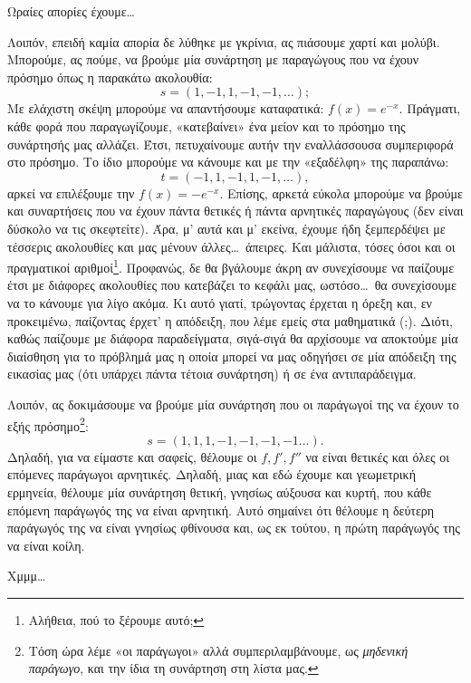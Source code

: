 \documentclass[11pt,a4paper]{article}
\theoremstyle{definition}
\begin{document}
	Ωραίες απορίες έχουμε\ldots
	
	Λοιπόν, επειδή καμία απορία δε λύθηκε με γκρίνια, ας πιάσουμε χαρτί και μολύβι. Μπορούμε, ας πούμε, να βρούμε μία συνάρτηση με παραγώγους που να έχουν πρόσημο όπως η παρακάτω ακολουθία:
	\[s=(1,-1,1,-1,-1,\ldots);\]
	Με ελάχιστη σκέψη μπορούμε να απαντήσουμε καταφατικά: $f(x)=e^{-x}$. Πράγματι, κάθε φορά που παραγωγίζουμε, «κατεβαίνει» ένα μείον και το πρόσημο της συνάρτησής μας αλλάζει. Έτσι, πετυχαίνουμε αυτήν την εναλλάσσουσα συμπεριφορά στο πρόσημο. Το ίδιο μπορούμε να κάνουμε και με την «εξαδέλφη» της παραπάνω:
	\[t=(-1,1,-1,1,-1,\ldots),\]
	αρκεί να επιλέξουμε την $f(x)=-e^{-x}$. Επίσης, αρκετά εύκολα μπορούμε να βρούμε και συναρτήσεις που να έχουν πάντα θετικές ή πάντα αρνητικές παραγώγους (δεν είναι δύσκολο να τις σκεφτείτε). Άρα, μ' αυτά και μ' εκείνα, έχουμε ήδη ξεμπερδέψει με τέσσερις ακολουθίες και μας μένουν άλλες\ldots\  άπειρες. Και μάλιστα, τόσες όσοι και οι πραγματικοί αριθμοί\footnote{Αλήθεια, πού το ξέρουμε αυτό;}. Προφανώς, δε θα βγάλουμε άκρη αν συνεχίσουμε να παίζουμε έτσι με διάφορες ακολουθίες που κατεβάζει το κεφάλι μας, ωστόσο\ldots\ θα συνεχίσουμε να το κάνουμε για λίγο ακόμα. Κι αυτό γιατί, τρώγοντας έρχεται η όρεξη και, εν προκειμένω, παίζοντας έρχετ' η απόδειξη, που λέμε εμείς στα μαθηματικά (;). Διότι, καθώς παίζουμε με διάφορα παραδείγματα, σιγά-σιγά θα αρχίσουμε να αποκτούμε μία διαίσθηση για το πρόβλημά μας η οποία μπορεί να μας οδηγήσει σε μία απόδειξη της εικασίας μας (ότι υπάρχει πάντα τέτοια συνάρτηση) ή σε ένα αντιπαράδειγμα.
	
	Λοιπόν, ας δοκιμάσουμε να βρούμε μία συνάρτηση που οι παράγωγοί της να έχουν το εξής πρόσημο\footnote{Τόση ώρα λέμε «οι παράγωγοι» αλλά συμπεριλαμβάνουμε, ως \textit{μηδενική παράγωγο}, και την ίδια τη συνάρτηση στη λίστα μας.}:
	\[s=(1,1,1,-1,-1,-1,-1\ldots).\]
	Δηλαδή, για να είμαστε και σαφείς, θέλουμε οι $f,f',f''$ να είναι θετικές και όλες οι επόμενες παράγωγοι αρνητικές. Δηλαδή, μιας και εδώ έχουμε και γεωμετρική ερμηνεία, θέλουμε μία συνάρτηση θετική, γνησίως αύξουσα και κυρτή, που κάθε επόμενη παράγωγός της να είναι αρνητική. Αυτό σημαίνει ότι θέλουμε η δεύτερη παράγωγός της να είναι γνησίως φθίνουσα και, ως εκ τούτου, η πρώτη παράγωγός της να είναι κοίλη.
	
	Χμμμ\ldots
	
\end{document}

